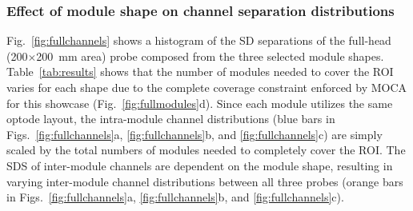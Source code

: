 \subsubsection{Effect of module shape on channel separation distributions}
Fig.~\ref{fig:fullchannels} shows a histogram of the SD separations of the full-head (200$\times$200~mm area) probe composed from the three selected module shapes. Table~\ref{tab:results} shows that the number of modules needed to cover the ROI varies for each shape due to the complete coverage constraint enforced by MOCA for this showcase (Fig.~\ref{fig:fullmodules}d). Since each module utilizes the same optode layout, the intra-module channel distributions (blue bars in Figs.~\ref{fig:fullchannels}a, \ref{fig:fullchannels}b, and \ref{fig:fullchannels}c) are simply scaled by the total numbers of modules needed to completely cover the ROI. The SDS of inter-module channels are dependent on the module shape, resulting in varying inter-module channel distributions between all three probes (orange bars in Figs.~\ref{fig:fullchannels}a, \ref{fig:fullchannels}b, and \ref{fig:fullchannels}c). 

